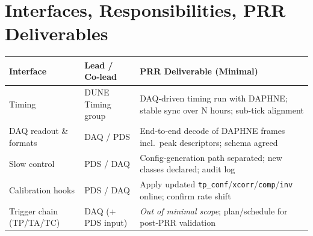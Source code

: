 
\section{Interfaces, Responsibilities, PRR Deliverables}
\begin{tabular}{@{}p{3cm}p{3.5cm}p{7.8cm}@{}}
\toprule
\textbf{Interface} & \textbf{Lead / Co‑lead} & \textbf{PRR Deliverable (Minimal)} \\\midrule
Timing & DUNE Timing group & DAQ‑driven timing run with DAPHNE; stable sync over N hours; sub-tick alignment \\
DAQ readout \& formats & DAQ / PDS & End‑to‑end decode of DAPHNE frames incl.\ peak descriptors; schema agreed \\
Slow control & PDS / DAQ & Config‑generation path separated; new classes declared; audit log \\
Calibration hooks & PDS / DAQ & Apply updated \texttt{tp\_conf}/\texttt{xcorr}/\texttt{comp}/\texttt{inv} online; confirm rate shift \\
Trigger chain (TP/TA/TC) & DAQ (+ PDS input) & \emph{Out of minimal scope}; plan/schedule for post‑PRR validation \\\bottomrule
\end{tabular}
